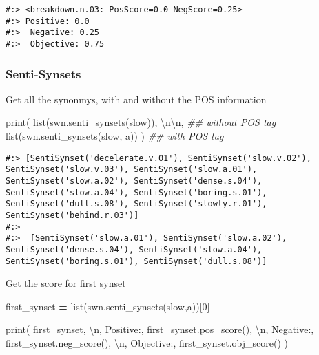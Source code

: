 \documentclass[
]{book}
\newenvironment{Shaded}{\begin{snugshade}}{\end{snugshade}}
\newcommand{\BuiltInTok}[1]{#1}
\newcommand{\CharTok}[1]{\textcolor[rgb]{0.5,0.5,0.5}{#1}}
\newcommand{\CommentTok}[1]{\textcolor[rgb]{0.37,0.37,0.37}{\textit{#1}}}
\newcommand{\DecValTok}[1]{\textcolor[rgb]{0.06,0.06,0.06}{#1}}
\newcommand{\NormalTok}[1]{#1}
\newcommand{\OperatorTok}[1]{\textcolor[rgb]{0.43,0.43,0.43}{\textbf{#1}}}
\newcommand{\StringTok}[1]{\textcolor[rgb]{0.5,0.5,0.5}{#1}}
\begin{document}
\begin{verbatim}
#:> <breakdown.n.03: PosScore=0.0 NegScore=0.25> 
#:> Positive: 0.0 
#:>  Negative: 0.25 
#:>  Objective: 0.75
\end{verbatim}

\hypertarget{senti-synsets}{%
\subsubsection{Senti-Synsets}\label{senti-synsets}}

Get all the synonmys, with and without the POS information

\begin{Shaded}
\begin{Highlighting}[]
\BuiltInTok{print}\NormalTok{( }\BuiltInTok{list}\NormalTok{(swn.senti\_synsets(}\StringTok{\textquotesingle{}slow\textquotesingle{}}\NormalTok{)), }\StringTok{\textquotesingle{}}\CharTok{\textbackslash{}n\textbackslash{}n}\StringTok{\textquotesingle{}}\NormalTok{,  }\CommentTok{\#\# without POS tag}
       \BuiltInTok{list}\NormalTok{(swn.senti\_synsets(}\StringTok{\textquotesingle{}slow\textquotesingle{}}\NormalTok{, }\StringTok{\textquotesingle{}a\textquotesingle{}}\NormalTok{)) )   }\CommentTok{\#\# with POS tag}
\end{Highlighting}
\end{Shaded}

\begin{verbatim}
#:> [SentiSynset('decelerate.v.01'), SentiSynset('slow.v.02'), SentiSynset('slow.v.03'), SentiSynset('slow.a.01'), SentiSynset('slow.a.02'), SentiSynset('dense.s.04'), SentiSynset('slow.a.04'), SentiSynset('boring.s.01'), SentiSynset('dull.s.08'), SentiSynset('slowly.r.01'), SentiSynset('behind.r.03')] 
#:> 
#:>  [SentiSynset('slow.a.01'), SentiSynset('slow.a.02'), SentiSynset('dense.s.04'), SentiSynset('slow.a.04'), SentiSynset('boring.s.01'), SentiSynset('dull.s.08')]
\end{verbatim}

Get the score for first synset

\begin{Shaded}
\begin{Highlighting}[]
\NormalTok{first\_synset }\OperatorTok{=} \BuiltInTok{list}\NormalTok{(swn.senti\_synsets(}\StringTok{\textquotesingle{}slow\textquotesingle{}}\NormalTok{,}\StringTok{\textquotesingle{}a\textquotesingle{}}\NormalTok{))[}\DecValTok{0}\NormalTok{]}

\BuiltInTok{print}\NormalTok{(}
\NormalTok{  first\_synset, }\StringTok{\textquotesingle{}}\CharTok{\textbackslash{}n}\StringTok{\textquotesingle{}}\NormalTok{,}
  \StringTok{\textquotesingle{}Positive:\textquotesingle{}}\NormalTok{,  first\_synset.pos\_score(), }\StringTok{\textquotesingle{}}\CharTok{\textbackslash{}n}\StringTok{\textquotesingle{}}\NormalTok{,}
  \StringTok{\textquotesingle{}Negative:\textquotesingle{}}\NormalTok{,  first\_synset.neg\_score(), }\StringTok{\textquotesingle{}}\CharTok{\textbackslash{}n}\StringTok{\textquotesingle{}}\NormalTok{,}
  \StringTok{\textquotesingle{}Objective:\textquotesingle{}}\NormalTok{, first\_synset.obj\_score()}
\NormalTok{)}
\end{Highlighting}
\end{Shaded}
\end{document}
